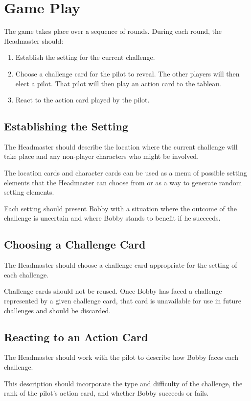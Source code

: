 \documentclass[a4paper, 10pt,notumble]{leaflet}
\begin{document}
\newpage
\section{Game Play}
The game takes place over a sequence of rounds. During each round, the Headmaster should:
\begin{enumerate}
	\item Establish the setting for the current challenge. 
	\item Choose a challenge card for the pilot to reveal. The  other players will then elect a pilot. That pilot will then play an action card to the tableau.
	\item React to the action card played by the pilot.
\end{enumerate}

\subsection{Establishing the Setting}
The Headmaster should describe the location where the current challenge will take place and any non-player characters who might be involved.

The location cards and character cards can be used as a menu of possible setting elements that the Headmaster can choose from or as a way to generate random setting elements.

Each setting should present Bobby with a situation where the outcome  of the challenge is uncertain and where Bobby stands to benefit if he succeeds. 


\subsection{Choosing a Challenge Card}
The Headmaster should choose a challenge card appropriate for the setting of each challenge.

Challenge cards should not be reused.  Once Bobby has faced a challenge represented by a given challenge card, that card is unavailable for use in future challenges and should be discarded.
  

\subsection{Reacting to an Action Card}
The Headmaster should work with the pilot to describe how Bobby faces each challenge.

This description should incorporate the type and difficulty of the challenge, the rank of the pilot's action card, and whether Bobby succeeds or fails.
\end{document}
